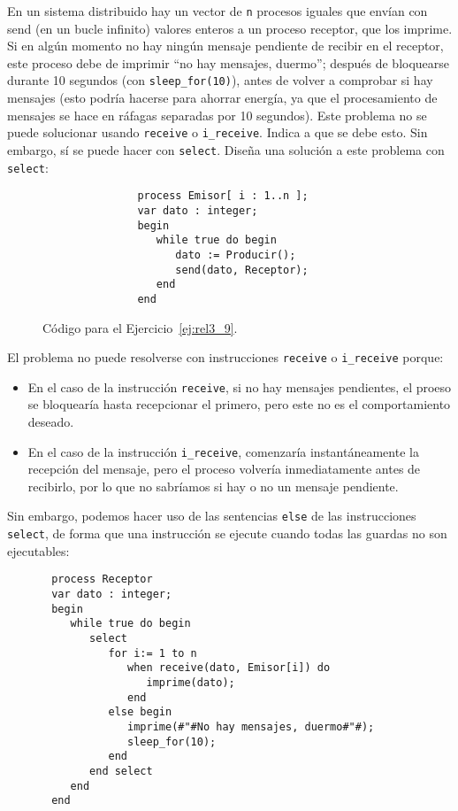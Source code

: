 \begin{ejercicio}\label{ej:rel3_9}
   En un sistema distribuido hay un vector de \verb|n| procesos iguales que envían con send (en un bucle infinito) valores enteros a un proceso receptor, que los imprime. Si en algún momento no hay ningún mensaje pendiente de recibir en el receptor, este proceso debe de imprimir ``no hay mensajes, duermo''; después de bloquearse durante 10 segundos (con \verb|sleep_for(10)|), antes de volver a comprobar si hay mensajes (esto podría hacerse para ahorrar energía, ya que el procesamiento de mensajes se hace en ráfagas separadas por 10 segundos). Este problema no se puede solucionar usando \verb|receive| o \verb|i_receive|. Indica a que se debe esto. Sin embargo, sí se puede hacer con \verb|select|. Diseña una solución a este problema con \verb|select|:
    \begin{figure}[H]
       \centering
           \begin{verbatim}
               process Emisor[ i : 1..n ];
               var dato : integer;
               begin
                  while true do begin
                     dato := Producir();
                     send(dato, Receptor);
                  end
               end
           \end{verbatim}
       \caption{Código para el Ejercicio~\ref{ej:rel3_9}.}
       \label{fig:cod_9}
   \end{figure}
   El problema no puede resolverse con instrucciones \verb|receive| o \verb|i_receive| porque:
   \begin{itemize}
       \item En el caso de la instrucción \verb|receive|, si no hay mensajes pendientes, el proeso se bloquearía hasta recepcionar el primero, pero este no es el comportamiento deseado.
       \item En el caso de la instrucción \verb|i_receive|, comenzaría instantáneamente la recepción del mensaje, pero el proceso volvería inmediatamente antes de recibirlo, por lo que no sabríamos si hay o no un mensaje pendiente.
   \end{itemize}
   Sin embargo, podemos hacer uso de las sentencias \verb|else| de las instrucciones \verb|select|, de forma que una instrucción se ejecute cuando todas las guardas no son ejecutables:
   \begin{verbatim}
       process Receptor
       var dato : integer;
       begin
          while true do begin
             select
                for i:= 1 to n
                   when receive(dato, Emisor[i]) do
                      imprime(dato);
                   end
                else begin
                   imprime(#"#No hay mensajes, duermo#"#);
                   sleep_for(10);
                end
             end select
          end
       end
   \end{verbatim}
\end{ejercicio}

